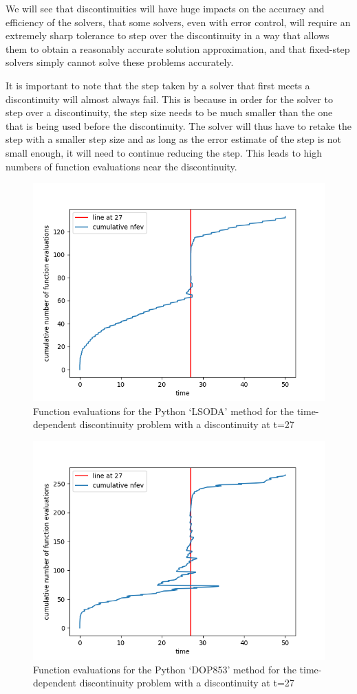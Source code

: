 We will see that discontinuities will have huge impacts on the accuracy and efficiency of the solvers, that some solvers, even with error control, will require an extremely sharp tolerance to step over the discontinuity in a way that allows them to obtain a reasonably accurate solution approximation, and that fixed-step solvers simply cannot solve these problems accurately. 

It is important to note that the step taken by a solver that first meets a discontinuity will almost always fail. This is because in order for the solver to step over a discontinuity, the step size needs to be much smaller than the one that is being used before the discontinuity. The solver will thus have to retake the step with a smaller step size and as long as the error estimate of the step is not small enough, it will need to continue reducing the step. This leads to high numbers of function evaluations near the discontinuity. 

\begin{figure}[h]
\centering
\includegraphics[width=0.7\linewidth]{./figures/lsoda_vs_discontinuity}
\caption{Function evaluations for the Python `LSODA' method for the time-dependent discontinuity problem with a discontinuity at t=27}
\label{fig:lsoda_vs_discontinuity}
\end{figure}

\begin{figure}[h]
\centering
\includegraphics[width=0.7\linewidth]{./figures/dop853_vs_discontinuity}
\caption{Function evaluations for the Python `DOP853' method for the time-dependent discontinuity problem with a discontinuity at t=27}
\label{fig:dop853_vs_discontinuity}
\end{figure}


